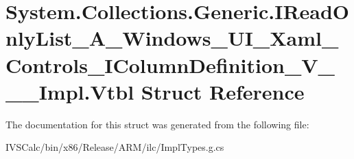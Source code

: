 \hypertarget{struct_system_1_1_collections_1_1_generic_1_1_i_read_only_list___a___windows___u_i___xaml___contfd364924453bdb832ad0936bc6523263}{}\section{System.\+Collections.\+Generic.\+I\+Read\+Only\+List\+\_\+\+A\+\_\+\+Windows\+\_\+\+U\+I\+\_\+\+Xaml\+\_\+\+Controls\+\_\+\+I\+Column\+Definition\+\_\+\+V\+\_\+\+\_\+\+\_\+\+Impl.\+Vtbl Struct Reference}
\label{struct_system_1_1_collections_1_1_generic_1_1_i_read_only_list___a___windows___u_i___xaml___contfd364924453bdb832ad0936bc6523263}


The documentation for this struct was generated from the following file\+:\begin{DoxyCompactItemize}
\item 
I\+V\+S\+Calc/bin/x86/\+Release/\+A\+R\+M/ilc/Impl\+Types.\+g.\+cs\end{DoxyCompactItemize}
